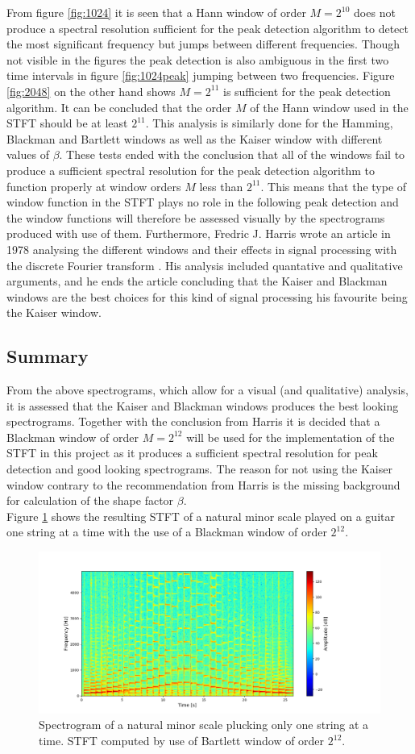 From figure \ref{fig:1024} it is seen that a Hann window of order $M=2^{10}$ does not produce a spectral resolution sufficient for the peak detection algorithm to detect the most significant frequency but jumps between different frequencies. Though not visible in the figures the peak detection is also ambiguous in the first two time intervals in figure \ref{fig:1024peak} jumping between two frequencies. Figure \ref{fig:2048} on the other hand shows $M=2^{11}$ is sufficient for the peak detection algorithm. It can be concluded that the order $M$ of the Hann window used in the STFT should be at least $2^{11}$. This analysis is similarly done for the Hamming, Blackman and Bartlett windows as well as the Kaiser window with different values of $\beta$. These tests ended with the conclusion that all of the windows fail to produce a sufficient spectral resolution for the peak detection algorithm to function properly at window orders $M$ less than $2^{11}$. This means that the type of window function in the STFT plays no role in the following peak detection and the window functions will therefore be assessed visually by the spectrograms produced with use of them. Furthermore, Fredric J. Harris wrote an article in 1978 analysing the different windows and their effects in signal processing with the discrete Fourier transform \cite{page 82, fredric_harris}. His analysis included quantative and qualitative arguments, and he ends the article concluding that the Kaiser and Blackman windows are the best choices for this kind of signal processing his favourite being the Kaiser window.
\subsection{Summary}
From the above spectrograms, which allow for a visual (and qualitative) analysis, it is assessed that the Kaiser and Blackman windows produces the best looking spectrograms. Together with the conclusion from Harris it is decided that a Blackman window of order $M=2^{12}$ will be used for the implementation of the STFT in this project as it produces a sufficient spectral resolution for peak detection and good looking spectrograms. The reason for not using the Kaiser window contrary to the recommendation from Harris is the missing background for calculation of the shape factor $\beta$.\\
Figure \ref{fig:STFT_test_signal} shows the resulting STFT of a natural minor scale played on a guitar one string at a time with the use of a Blackman window of order $2^{12}$.

\begin{figure}[H]
\centering
\includegraphics[width = 1.1\textwidth]{figures/validation/stft/scale.png}
\caption{Spectrogram of a natural minor scale plucking only one string at a time. STFT computed by use of Bartlett window of order $2^{12}$.}
\label{fig:STFT_test_signal}
\end{figure}